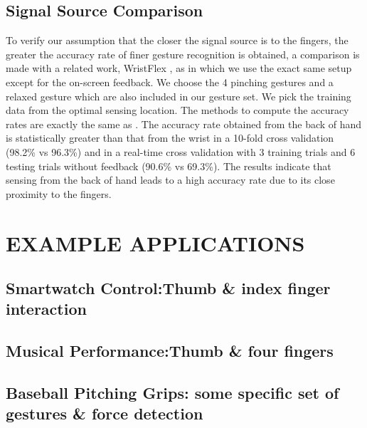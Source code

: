 \documentclass{sigchi}
\begin{document}
\subsection{Signal Source Comparison}
To verify our assumption that the closer the signal source is to the fingers, the greater the accuracy rate of finer gesture recognition is obtained, a comparison is made with a related work, WristFlex \cite{Dementyev:2014:WLG:2642918.2647396}, as in which we use the exact same setup except for the on-screen feedback.
We choose the 4 pinching gestures and a relaxed gesture \cite{Dementyev:2014:WLG:2642918.2647396} which are also included in our gesture set. We pick the training data from the optimal sensing location. The methods to compute the accuracy rates are exactly the same as \cite{Dementyev:2014:WLG:2642918.2647396}. The accuracy rate obtained from the back of hand is statistically greater than that from the wrist in a 10-fold cross validation (98.2\% vs 96.3\%) and in a real-time cross validation with 3 training trials and 6 testing trials without feedback (90.6\% vs 69.3\%). The results indicate that sensing from the back of hand leads to a high accuracy rate due to its close proximity to the fingers.

\section{EXAMPLE APPLICATIONS}

\subsection{Smartwatch Control:Thumb \& index finger interaction}
    
\subsection{Musical Performance:Thumb \& four fingers}
    
\subsection{Baseball Pitching Grips: some specific set of gestures \& force detection}
    
\end{document}
